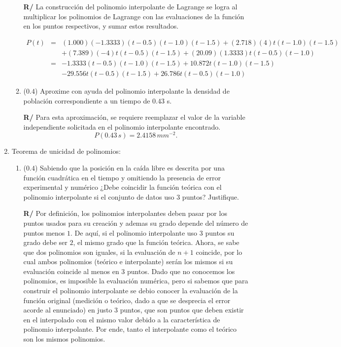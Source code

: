 \documentclass[12pt]{article}
\begin{document}
\begin{enumerate}[leftmargin=*,widest=9]
\begin{enumerate}[label=\alph*]
    \textbf{R/} La construcción del polinomio interpolante de Lagrange se logra al multiplicar los polinomios de Lagrange con las evaluaciones de la función en los puntos respectivos, y sumar estos resultados.
    
    \begin{eqnarray*}
    P(t)& = & (1.000)(-1.3333)(t-0.5)(t-1.0)(t-1.5)+(2.718)(4)t(t-1.0)(t-1.5) \\
    && +(7.389)(-4)t(t-0.5)(t-1.5)+(20.09)(1.3333)t(t-0.5)(t-1.0) \\
    & = & -1.3333(t-0.5)(t-1.0)(t-1.5) + 10.872t(t-1.0)(t-1.5) \\
    && - 29.556t(t-0.5)(t-1.5) + 26.786t(t-0.5)(t-1.0)
    \end{eqnarray*}
    \item (\(0.4\)) Aproxime con ayuda del polinomio interpolante la densidad de población correspondiente a un tiempo de \(0.43\) s.
    
    \textbf{R/} Para esta aproximación, se requiere reemplazar el valor de la variable independiente solicitada en el polinomio interpolante encontrado. \[ P(0.43\,s) = 2.4158\,mm^{-2}.\]
    \end{enumerate}
    
    \item Teorema de unicidad de polinomios:
    
    \begin{enumerate}[label=\alph*]
    \item (\(0.4\)) Sabiendo que la posición en la caída libre es descrita por una función cuadrática en el tiempo y omitiendo la presencia de error experimental y numérico ¿Debe coincidir la función teórica con el polinomio interpolante si el conjunto de datos uso 3 puntos? Justifique.
    
    \textbf{R/} Por definición, los polinomios interpolantes deben pasar por los puntos usados para su creación y ademas su grado depende del número de puntos menos \(1\). De aquí, si el polinomio interpolante uso 3 puntos su grado debe ser \(2\), el mismo grado que la función teórica. Ahora, se sabe que dos polinomios son iguales, si la evaluación de \(n+1\) coincide, por lo cual ambos polinomios (teórico e interpolante) serán los mismos si su evaluación coincide al menos en 3 puntos. Dado que no conocemos los polinomios, es imposible la evaluación numérica, pero si sabemos que para construir el polinomio interpolante se debio conocer la evaluación de la función original (medición o teórico, dado a que se desprecia el error acorde al enunciado) en justo 3 puntos, que son puntos que deben existir en el interpolado con el mismo valor debido a la característica de polinomio interpolante. Por ende, tanto el interpolante como el teórico son los mismos polinomios.


\end{enumerate}
\end{enumerate}
\end{document}
